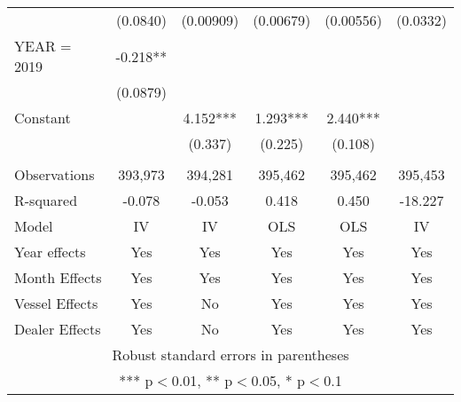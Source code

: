 \begin{tabular}{lccccc}
 & (0.0840) & (0.00909) & (0.00679) & (0.00556) & (0.0332) \\
YEAR = 2019 & -0.218** &  &  &  &  \\
 & (0.0879) &  &  &  &  \\
Constant &  & 4.152*** & 1.293*** & 2.440*** &  \\
 &  & (0.337) & (0.225) & (0.108) &  \\
 &  &  &  &  &  \\
Observations & 393,973 & 394,281 & 395,462 & 395,462 & 395,453 \\
R-squared & -0.078 & -0.053 & 0.418 & 0.450 & -18.227 \\
Model & IV & IV & OLS & OLS & IV \\
Year effects & Yes & Yes & Yes & Yes & Yes \\
Month Effects & Yes & Yes & Yes & Yes & Yes \\
Vessel Effects & Yes & No & Yes & Yes & Yes \\
 Dealer Effects & Yes & No & Yes & Yes & Yes \\ \hline
\multicolumn{6}{c}{ Robust standard errors in parentheses} \\
\multicolumn{6}{c}{ *** p$<$0.01, ** p$<$0.05, * p$<$0.1} \\
\end{tabular}
